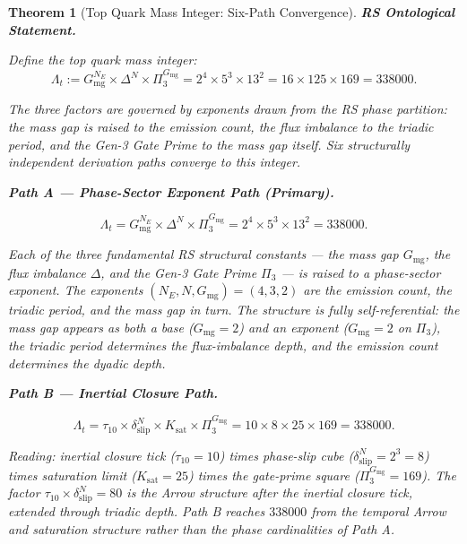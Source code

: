 \documentclass[11pt, letterpaper]{article}
\theoremstyle{definition}
\theoremstyle{plain}
\newtheorem{theorem}{Theorem}[section]
\begin{document}
\begin{theorem}[Top Quark Mass Integer: Six-Path Convergence]

\textbf{RS Ontological Statement.}

Define the top quark mass integer:
\begin{equation}
    \Lambda_t := G_\mathrm{mg}^{N_E} \times \Delta^N \times \Pi_3^{G_\mathrm{mg}}
               = 2^4 \times 5^3 \times 13^2 = 16 \times 125 \times 169 = 338000.
\end{equation}

The three factors are governed by exponents drawn from the RS phase partition:
the mass gap is raised to the emission count, the flux imbalance to the triadic period,
and the Gen-3 Gate Prime to the mass gap itself. Six structurally independent derivation
paths converge to this integer.

\medskip
\noindent\textbf{Path A — Phase-Sector Exponent Path (Primary).}

\begin{equation}
    \Lambda_t = G_\mathrm{mg}^{N_E} \times \Delta^N \times \Pi_3^{G_\mathrm{mg}}
              = 2^4 \times 5^3 \times 13^2 = 338000.
\end{equation}

Each of the three fundamental RS structural constants — the mass gap $G_\mathrm{mg}$,
the flux imbalance $\Delta$, and the Gen-3 Gate Prime $\Pi_3$ — is raised to a
phase-sector exponent. The exponents $(N_E, N, G_\mathrm{mg}) = (4, 3, 2)$ are the
emission count, the triadic period, and the mass gap in turn. The structure is fully
self-referential: the mass gap appears as both a base ($G_\mathrm{mg} = 2$) and an
exponent ($G_\mathrm{mg} = 2$ on $\Pi_3$), the triadic period determines the flux-imbalance
depth, and the emission count determines the dyadic depth.

\medskip
\noindent\textbf{Path B — Inertial Closure Path.}

\begin{equation}
    \Lambda_t = \tau_{10} \times \delta_\mathrm{slip}^N \times K_\mathrm{sat} \times \Pi_3^{G_\mathrm{mg}}
              = 10 \times 8 \times 25 \times 169 = 338000.
\end{equation}

Reading: inertial closure tick ($\tau_{10} = 10$) times phase-slip cube
($\delta_\mathrm{slip}^N = 2^3 = 8$) times saturation limit ($K_\mathrm{sat} = 25$)
times the gate-prime square ($\Pi_3^{G_\mathrm{mg}} = 169$). The factor
$\tau_{10} \times \delta_\mathrm{slip}^N = 80$ is the Arrow structure after the
inertial closure tick, extended through triadic depth. Path B reaches $338000$
from the temporal Arrow and saturation structure rather than the phase cardinalities
of Path A.


\end{theorem}
\end{document}
